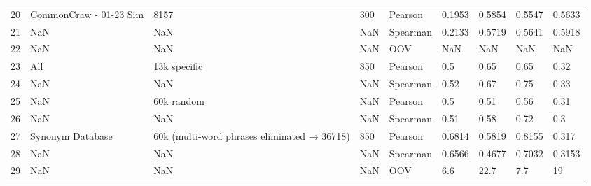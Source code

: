 \begin{table}
\begin{tabularx}{\textwidth}{*{9}{X}}
    20 &                             CommonCraw - 01-23 Sim &                                         8157 &        300 &    Pearson &     0.1953 &     0.5854 &     0.5547 &      0.5633 \\
    21 &                                                NaN &                                          NaN &        NaN &   Spearman &     0.2133 &     0.5719 &     0.5641 &      0.5918 \\
    22 &                                                NaN &                                          NaN &        NaN &        OOV &        NaN &        NaN &        NaN &         NaN \\
    23 &                                                All &                                 13k specific &        850 &    Pearson &        0.5 &       0.65 &       0.65 &        0.32 \\
    24 &                                                NaN &                                          NaN &        NaN &   Spearman &       0.52 &       0.67 &       0.75 &        0.33 \\
    25 &                                                NaN &                                   60k random &        NaN &    Pearson &        0.5 &       0.51 &       0.56 &        0.31 \\
    26 &                                                NaN &                                          NaN &        NaN &   Spearman &       0.51 &       0.58 &       0.72 &         0.3 \\
    27 &                                   Synonym Database &  60k (multi-word phrases eliminated → 36718) &        850 &    Pearson &     0.6814 &     0.5819 &     0.8155 &       0.317 \\
    28 &                                                NaN &                                          NaN &        NaN &   Spearman &     0.6566 &     0.4677 &     0.7032 &      0.3153 \\
    29 &                                                NaN &                                          NaN &        NaN &        OOV &        6.6 &       22.7 &        7.7 &          19 \\
    \bottomrule
    \end{tabularx}
\end{table}

